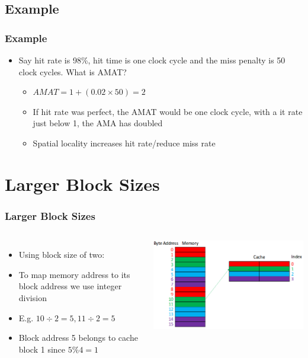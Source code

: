 \documentclass{beamer}
\begin{document}
\subsection{Example}
\begin{frame}
\frametitle{Example}
\begin{itemize}
\item Say hit rate is 98\%, hit time is one clock cycle and the miss penalty is 50 clock cycles. What is AMAT?
\begin{itemize}
\item $AMAT = 1 + (0.02\times 50) = 2$
\item If hit rate was perfect, the AMAT would be one clock cycle, with a it rate just below 1, the AMA has doubled
\item Spatial locality increases hit rate/reduce miss rate
\end{itemize}
\end{itemize}
\end{frame}
\section{Larger Block Sizes}
\begin{frame}
\frametitle{Larger Block Sizes}
\begin{columns}[c]
\begin{itemize}
\item Using block size of two:
\item To map memory address to its {\color{red}block address} we use integer division
\item E.g. {\color{green}$10\div2 = 5, 11\div2=5$} 
\item Block address 5 belongs to cache block 1 since $5\%4 = 1$
\end{itemize}
\includegraphics[scale=0.35]{large.png}
\end{columns}
\end{frame}
\end{document}
